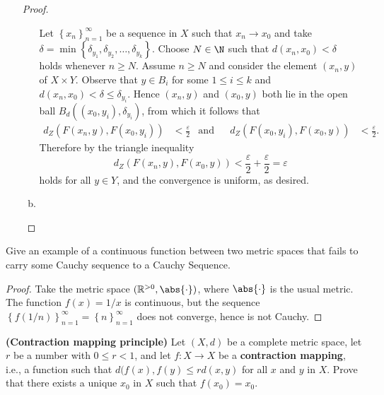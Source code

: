 \documentclass[12pt]{amsart}
\begin{document}
\begin{setup}
\begin{enumerate}[(a)]
\begin{proof}
\begin{enumerate}[(a)]
          Let $\left\{x_n\right\}_{n=1}^{\infty}$ be a sequence in $X$ such that $x_n \rightarrow x_0$ and take $\delta = \min \left\{\delta_{y_1}, \delta_{y_2}, \ldots, \delta_{y_k}\right\}$.
          Choose $N \in \N$ such that $d(x_n, x_0) < \delta$ holds whenever $n \geq N$.
          Assume $n \geq N$ and consider the element $(x_n, y)$ of  $X \times Y$.
          Observe that $y \in B_i$ for some $1 \leq i \leq k$ and $d(x_n, x_0) < \delta \leq \delta_{y_i}$.
          Hence $(x_n, y)$ and $(x_0, y)$ both lie in the open ball $B_d\left(\left(x_0, y_i\right), \delta_{y_i}\right)$, from which it follows that          
          \begin{align*}
            d_Z\left(F\left(x_n, y\right), F\left(x_0, y_i\right)\right) &< \frac{\varepsilon}{2} & \text{and}&& d_Z\left(F\left(x_0, y_i\right), F\left(x_0, y\right)\right) &< \frac{\varepsilon}{2}.
          \end{align*}
          Therefore by the triangle inequality 
          $$d_Z(F(x_n, y), F(x_0, y)) < \frac{\varepsilon}{2} + \frac{\varepsilon}{2} = \varepsilon$$
          holds for all $y \in Y$, and the convergence is uniform, as desired.
        \item
      \end{enumerate}
    \end{proof}
  \end{enumerate}
\end{setup}

\begin{setup}
  Give an example of a continuous function between two metric spaces that fails to carry some Cauchy sequence to a Cauchy Sequence.
  \begin{proof}
    Take the metric space $(\mathbb{R}^{>0}, \abs{\cdot})$, where $\abs{\cdot}$ is the usual metric.
    The function $f(x) = 1/x$ is continuous, but the sequence $\left\{f(1/n)\right\}_{n=1}^\infty = \left\{n\right\}_{n=1}^\infty$ does not converge, hence is not Cauchy.
  \end{proof}
\end{setup}

\begin{setup}
  {\bf (Contraction mapping principle)} Let $(X,d)$ be a complete metric space, let $r$ be a number with $0 \leq r < 1$, and let $f \colon X \rightarrow X$ be a {\bf contraction mapping}, i.e., a function such that $d(f(x), f(y) \leq rd(x,y)$ for all $x$ and $y$ in $X$.
  Prove that there exists a unique $x_0$ in $X$ such that $f(x_0) = x_0$.
\end{setup}
\end{document}
